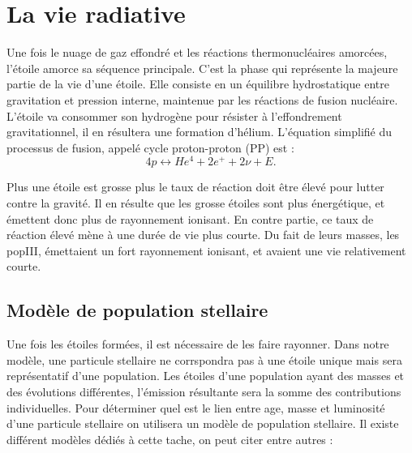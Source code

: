 \section{La vie radiative}
\label{sec:etoilerad}


Une fois le nuage de gaz effondré et les réactions thermonucléaires amorcées, l'étoile amorce sa séquence principale.
C'est la phase qui représente la majeure partie de la vie d'une étoile.
Elle consiste en un équilibre hydrostatique entre gravitation et pression interne, maintenue par les réactions de fusion nucléaire.
L'étoile va consommer son hydrogène pour résister à l'effondrement gravitationnel, il en résultera une formation d'hélium.
L'équation simplifié du processus de fusion, appelé cycle proton-proton (PP) est :
\begin{equation}
4p \leftrightarrow He^4 + 2e^+ + 2\nu + E.
\end{equation}

Plus une étoile est grosse plus le taux de réaction doit être élevé pour lutter contre la gravité.
Il en résulte que les grosse étoiles sont plus énergétique, et émettent donc plus de rayonnement ionisant.
En contre partie, ce taux de réaction élevé mène à une durée de vie plus courte.
Du fait de leurs masses, les popIII, émettaient un fort rayonnement ionisant, et avaient une vie relativement courte.




\subsection{Modèle de population stellaire}
\label{sec:staburst}

Une fois les étoiles formées, il est nécessaire de les faire rayonner.
Dans notre modèle, une particule stellaire ne corrspondra pas à une étoile unique mais sera représentatif d'une population.
Les étoiles d'une population ayant des masses et des évolutions différentes, l'émission résultante sera la somme des contributions individuelles.
Pour déterminer quel est le lien entre age, masse et luminosité d'une particule stellaire on utilisera un modèle de population stellaire.
Il existe différent modèles dédiés à cette tache, on peut citer entre autres :

